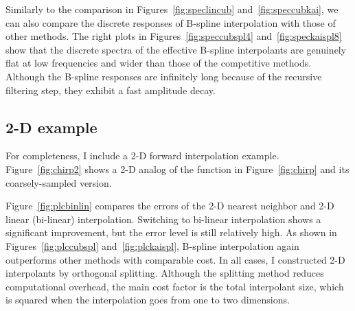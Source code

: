 
\par
Similarly to the comparison in Figures~\ref{fig:speclincub}
and~\ref{fig:speccubkai}, we can also compare the discrete responses
of B-spline interpolation with those of other methods. The right plots
in Figures~\ref{fig:speccubspl4} and~\ref{fig:speckaispl8} show that the
discrete spectra of the effective B-spline interpolants are genuinely
flat at low frequencies and wider than those of the competitive
methods. Although the B-spline responses are infinitely long because
of the recursive filtering step, they exhibit a fast amplitude decay.



\subsection{2-D example}


For completeness, I include a 2-D forward interpolation example.
Figure~\ref{fig:chirp2} shows a 2-D analog of the function in
Figure~\ref{fig:chirp} and its coarsely-sampled version.

\par
Figure~\ref{fig:plcbinlin} compares the errors of the 2-D nearest
neighbor and 2-D linear (bi-linear) interpolation. Switching to
bi-linear interpolation shows a significant improvement, but the error
level is still relatively high. As shown in
Figures~\ref{fig:plccubspl} and~\ref{fig:plckaispl}, B-spline
interpolation again outperforms other methods with comparable cost. In
all cases, I constructed 2-D interpolants by orthogonal splitting.
Although the splitting method reduces computational overhead, the main
cost factor is the total interpolant size, which is squared when the
interpolation goes from one to two dimensions.

